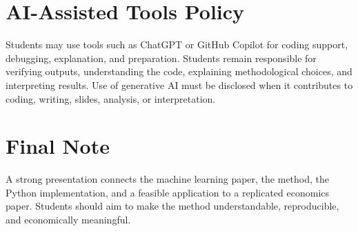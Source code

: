 \documentclass[11pt]{article}
\newcommand{\coloredsection}[1]{\vspace{2pt}\section*{\large\textcolor{sectioncolor}{#1}}\vspace{-2pt}}
\begin{document}
\coloredsection{AI-Assisted Tools Policy}

Students may use tools such as ChatGPT or GitHub Copilot for coding support, debugging, explanation, and preparation. Students remain responsible for verifying outputs, understanding the code, explaining methodological choices, and interpreting results. Use of generative AI must be disclosed when it contributes to coding, writing, slides, analysis, or interpretation.

\coloredsection{Final Note}

A strong presentation connects the machine learning paper, the method, the Python implementation, and a feasible application to a replicated economics paper. Students should aim to make the method understandable, reproducible, and economically meaningful.
\end{document}
